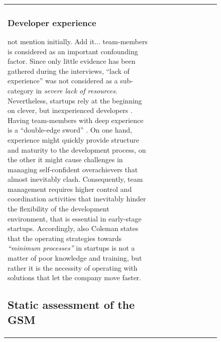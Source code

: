 \documentclass[12pt,journal,compsoc]{../sty/IEEEtran}
\begin{document}
\begin{table}[!t]
\begin{figure}[!t]
\begin{compactitem}
\begin{table}[!t]
\begin{tabular}{|l||c||c||c||c||c||c||c||c||c|}
\subsubsection{Developer experience}  %
not mention initially. Add it...  %
team-members is considered as an important  confounding factor. Since only
little evidence has been gathered during the  interviews, ``lack of experience''
was not considered as a sub-category in  \textit{severe lack of resources}.
Nevertheless, startups rely at the beginning  on clever, but inexperienced
developers \cite{Crowne2002}. Having team-members  with deep experience is a
``double-edge sword'' \cite{Yoffie1999}. On one hand,  experience might quickly
provide structure and maturity to the development  process, on the other it
might cause challenges in managing self-confident  overachievers that almost
inevitably clash. Consequently, team management  requires higher control and
coordination activities that inevitably hinder the  flexibility of the
development environment, that is essential in early-stage  startups.
Accordingly, also Coleman \cite{Coleman2007, Coleman2008a,Coleman2008} states
that the operating strategies towards  \textit{``minimum processes''} in
startups is not a matter of poor knowledge and  training, but rather it is the
necessity of operating with solutions that let  the company move faster.


\subsection{Static assessment of the GSM} \label{sect:theory:validation:stats}


\end{tabular}
\end{table}
\end{compactitem}
\end{figure}
\end{table}
\end{document}
